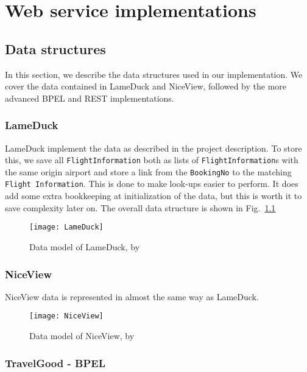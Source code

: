 {\setlength{\chapterfontsize}{23pt}
\chapter{Web service implementations}
}

\section{Data structures}
In this section, we describe the data structures used in our implementation. We cover the data contained in LameDuck and NiceView, followed by the more advanced BPEL and REST implementations.

\subsection{LameDuck}
\mkt

\noindent
LameDuck implement the data as described in the project description. To store this, we save all \texttt{FlightInformation} both as lists of \texttt{FlightInformation}s with the same origin airport and store a link from the \texttt{BookingNo} to the matching \texttt{Flight Information}. This is done to make look-ups easier to perform. It does add some extra bookkeeping at initialization of the data, but this is worth it to save complexity later on. The overall data structure is shown in Fig.~\ref{fig:lameduck_class}

\begin{figure}[H]
\centering
\texttt{[image: LameDuck]}
\caption{Data model of LameDuck, by \mrb{}}
\label{fig:lameduck_class}
\end{figure}


\subsection{NiceView}
\pet

\noindent
NiceView data is represented in almost the same way as LameDuck.

\begin{figure}[H]
\centering
\texttt{[image: NiceView]}
\caption{Data model of NiceView, by \kim{}}
\label{fig:niceview_class}
\end{figure}

\subsection{TravelGood - BPEL}
\pet

